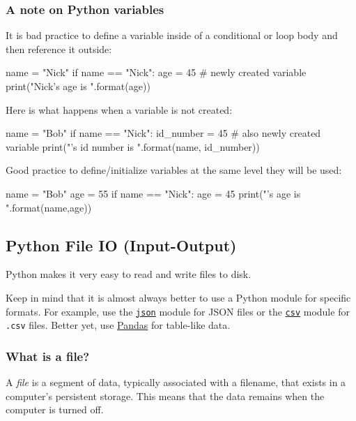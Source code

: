 \documentclass[12pt]{article} \newif\ifsolution\solutiontrue %
\begin{document}
\subsubsection{A note on Python
variables}\label{a-note-on-python-variables}

It is bad practice to define a variable inside of a conditional or loop
body and then reference it outside:

\begin{python}
name = "Nick" if name == "Nick":     age = 45 # newly created variable  print("Nick's age is {}".format(age))
\end{python}

Here is what happens when a variable is not created:

\begin{python}
name = "Bob" if name == "Nick":     id_number = 45 # also newly created variable  print("{}'s id number is {}".format(name, id_number))
\end{python}

Good practice to define/initialize variables at the same level they will
be used:

\begin{python}
name = "Bob" age = 55 if name == "Nick":     age = 45  print("{}'s age is {}".format(name,age))
\end{python}


\subsection{Python File IO
(Input-Output)}\label{python-file-io-input-output}

Python makes it very easy to read and write files to disk.

Keep in mind that it is almost always better to use a Python module for
specific formats. For example, use the
\href{https://docs.python.org/3/library/json.html}{\texttt{json}} module
for JSON files or the
\href{https://docs.python.org/3/library/csv.html}{\texttt{csv}} module
for \texttt{.csv} files. Better yet, use
\href{http://pandas.pydata.org/}{Pandas} for table-like data.

\subsubsection{What is a file?}\label{what-is-a-file}

A \emph{file} is a segment of data, typically associated with a
filename, that exists in a computer's persistent storage. This means
that the data remains when the computer is turned off.
\end{document}
